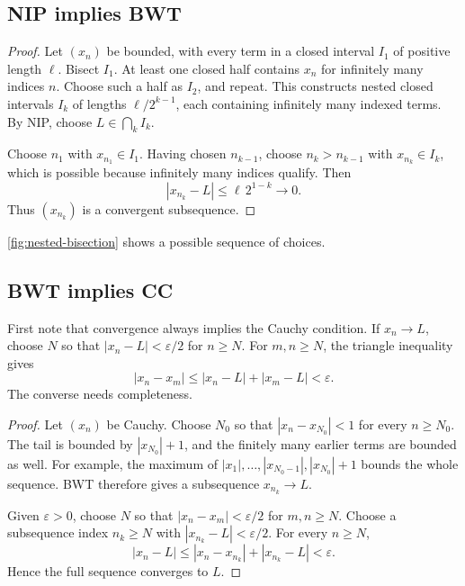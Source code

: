 \subsection{NIP implies BWT}
\begin{proof}
  Let $(x_n)$ be bounded, with every term in a closed interval $I_1$ of
  positive length $\ell$. Bisect $I_1$. At least one closed half contains $x_n$
  for infinitely many indices $n$. Choose such a half as $I_2$, and repeat.
  This constructs nested closed intervals $I_k$ of lengths
  $\ell/2^{k-1}$, each containing infinitely many indexed terms.
  By NIP, choose $L\in\bigcap_k I_k$.

  Choose $n_1$ with $x_{n_1}\in I_1$. Having chosen $n_{k-1}$, choose
  $n_k>n_{k-1}$ with $x_{n_k}\in I_k$, which is possible because infinitely
  many indices qualify. Then
  \[
    |x_{n_k}-L|\leq \ell\,2^{1-k}\longrightarrow0.
  \]
  Thus $(x_{n_k})$ is a convergent subsequence.
\end{proof}
\autoref{fig:nested-bisection} shows a possible sequence of choices.
\begin{marginfigure}
  \centering
  
  \caption[Nested intervals under bisection.]{Schematic bisection. Each chosen interval contains infinitely
    many terms, counted by index. The process continues beyond the rows shown.}
  \label{fig:nested-bisection}
\end{marginfigure}

\subsection{BWT implies CC}
First note that convergence always implies the Cauchy condition. If
$x_n\to L$, choose $N$ so that $|x_n-L|<\varepsilon/2$ for $n\geq N$.
For $m,n\geq N$, the triangle inequality gives
\[
  |x_n-x_m|\leq|x_n-L|+|x_m-L|<\varepsilon.
\]
The converse needs completeness.

\begin{proof}
  Let $(x_n)$ be Cauchy. Choose $N_0$ so that $|x_n-x_{N_0}|<1$ for
  every $n\geq N_0$. The tail is bounded by $|x_{N_0}|+1$, and the finitely
  many earlier terms are bounded as well. For example, the maximum of
  $|x_1|,\ldots,|x_{N_0-1}|,|x_{N_0}|+1$ bounds the whole sequence.
  BWT therefore gives a subsequence $x_{n_k}\to L$.

  Given $\varepsilon>0$, choose $N$ so that $|x_n-x_m|<\varepsilon/2$
  for $m,n\geq N$. Choose a subsequence index $n_k\geq N$ with
  $|x_{n_k}-L|<\varepsilon/2$. For every $n\geq N$,
  \[
    |x_n-L|\leq|x_n-x_{n_k}|+|x_{n_k}-L|<\varepsilon.
  \]
  Hence the full sequence converges to $L$.
\end{proof}

